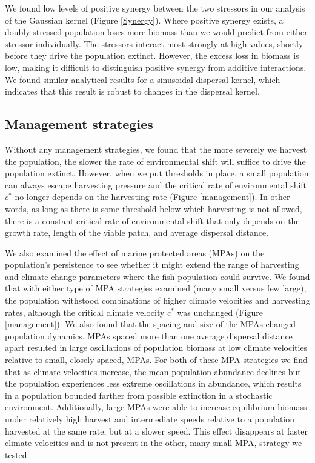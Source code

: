 \documentclass[12pt,english]{article}
\begin{document}
\begin{spacing}{1.9}
\begin{flushleft}
We found low levels of positive synergy between the two stressors in our analysis of the Gaussian kernel (Figure \ref{Synergy}).  Where positive synergy exists, a doubly stressed population loses more biomass than we would predict from either stressor individually.  The stressors interact most strongly at high values, shortly before they drive the population extinct.  However, the excess loss in biomass is low, making it difficult to distinguish positive synergy from additive interactions. %
We found similar analytical results for a sinusoidal dispersal kernel, which indicates that this result is robust to changes in the dispersal kernel.  

\subsection{Management strategies }

Without any management strategies, we found that the more severely we harvest the population, the slower the rate of environmental shift will suffice to drive the population extinct. However, when we put thresholds in place, a small population can always escape harvesting pressure and the critical rate of environmental shift $c^*$ no longer depends on the harvesting rate (Figure \ref{management}). In other words, as long as there is some threshold below which harvesting is not allowed, there is a constant critical rate of environmental shift that only depends on the growth rate, length of the viable patch, and average dispersal distance.  

We also examined the effect of marine protected  areas (MPAs) on the population's persistence to see whether it might extend the range of harvesting and  climate change parameters where the fish population could survive. We found that with either type of MPA strategies examined (many small versus few large), the population withstood combinations of higher climate velocities and harvesting rates, although the critical climate velocity $c^*$ was unchanged (Figure \ref{management}). We also found that the spacing and size of the MPAs changed population dynamics. MPAs spaced more than one average dispersal distance apart resulted in large oscillations of population biomass at low climate velocities relative to small, closely spaced, MPAs. For both of these MPA strategies we find that as climate velocities increase, the mean population abundance declines but the population experiences less extreme oscillations in abundance, which results in a population bounded farther from possible extinction in a stochastic environment. Additionally, large MPAs were able to increase equilibrium biomass under relatively high harvest and intermediate speeds relative to a population harvested at the same rate, but at a slower speed. This effect disappears at faster climate velocities and is not present in the other, many-small MPA, strategy we tested. 


\end{flushleft}
\end{spacing}
\end{document}
